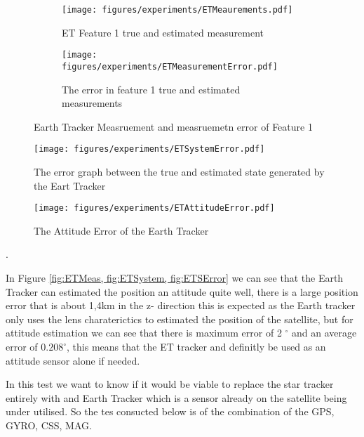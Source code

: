 \begin{figure}[H]
    \centering
    \begin{subfigure}[b]{0.48\linewidth}
        \centering
        \texttt{[image: figures/experiments/ETMeaurements.pdf]}
        \caption{ET Feature 1 true and estimated measurement}
        \label{fig:ETMeasurement}
    \end{subfigure}
    \hfill
    \begin{subfigure}[b]{0.48\linewidth}
        \centering
        \texttt{[image: figures/experiments/ETMeasurementError.pdf]}
        \caption{The error in feature 1 true and estimated measurements}
        \label{fig:ETMeasurementError}
    \end{subfigure}
    \caption{Earth Tracker Measruement and measruemetn error of Feature 1}
    \label{fig:ETMeas}
\end{figure}

\begin{figure}[H]
    \centering
    \texttt{[image: figures/experiments/ETSystemError.pdf]}
    \caption{The error graph between the true and estimated state generated by the Eart Tracker}
    \label{fig:ETSystem}
\end{figure}

\begin{figure}[H]
    \centering
    \texttt{[image: figures/experiments/ETAttitudeError.pdf]}
    \caption{The Attitude Error of the Earth Tracker}
    \label{fig:ETSError}
\end{figure}.

In Figure \ref{fig:ETMeas, fig:ETSystem, fig:ETSError} we can see that the Earth Tracker can estimated the position an attitude quite well, there is a large position error that is about 1,4km in the z- direction this is expected as the Earth tracker only uses the lens charaterictics to estimated the position of the satellite, but for attitude estimation we can see that there is maximum error of 2 $^{\circ}$ and an average error of $0.208 ^{\circ}$, this means that the ET tracker and definitly be used as an attitude sensor alone if needed.


In this test we want to know if it would be viable to replace the star tracker entirely with and Earth Tracker which is a sensor already on the satellite being under utilised. So the tes consucted below is of the combination of the GPS, GYRO, CSS, MAG.

